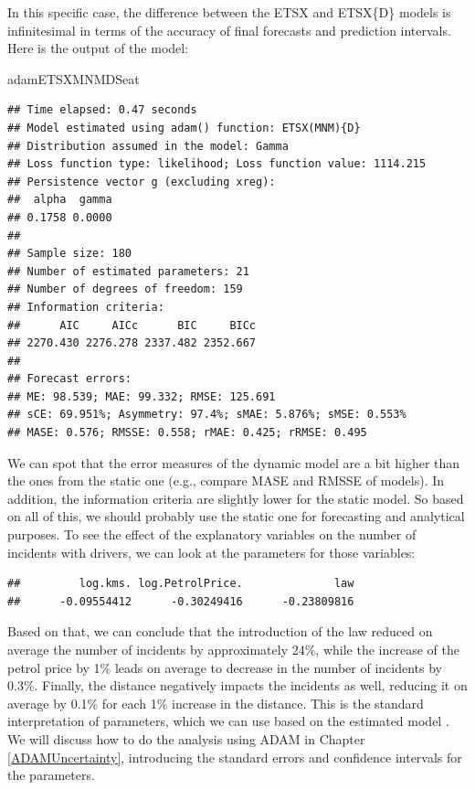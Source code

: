 \documentclass[
]{book}
\newenvironment{Shaded}{\begin{snugshade}}{\end{snugshade}}
\newcommand{\NormalTok}[1]{#1}
\newcommand{\SpecialCharTok}[1]{\textcolor[rgb]{0.00,0.00,0.00}{#1}}
\theoremstyle{definition}
\theoremstyle{definition}
\theoremstyle{definition}
\theoremstyle{definition}
\theoremstyle{remark}
\begin{document}
In this specific case, the difference between the ETSX and ETSX\{D\} models is infinitesimal in terms of the accuracy of final forecasts and prediction intervals. Here is the output of the model:

\begin{Shaded}
\begin{Highlighting}[]
\NormalTok{adamETSXMNMDSeat}
\end{Highlighting}
\end{Shaded}

\begin{verbatim}
## Time elapsed: 0.47 seconds
## Model estimated using adam() function: ETSX(MNM){D}
## Distribution assumed in the model: Gamma
## Loss function type: likelihood; Loss function value: 1114.215
## Persistence vector g (excluding xreg):
##  alpha  gamma 
## 0.1758 0.0000 
## 
## Sample size: 180
## Number of estimated parameters: 21
## Number of degrees of freedom: 159
## Information criteria:
##      AIC     AICc      BIC     BICc 
## 2270.430 2276.278 2337.482 2352.667 
## 
## Forecast errors:
## ME: 98.539; MAE: 99.332; RMSE: 125.691
## sCE: 69.951%; Asymmetry: 97.4%; sMAE: 5.876%; sMSE: 0.553%
## MASE: 0.576; RMSSE: 0.558; rMAE: 0.425; rRMSE: 0.495
\end{verbatim}

We can spot that the error measures of the dynamic model are a bit higher than the ones from the static one (e.g., compare MASE and RMSSE of models). In addition, the information criteria are slightly lower for the static model. So based on all of this, we should probably use the static one for forecasting and analytical purposes. To see the effect of the explanatory variables on the number of incidents with drivers, we can look at the parameters for those variables:

\begin{Shaded}
\end{Shaded}

\begin{verbatim}
##         log.kms. log.PetrolPrice.              law 
##      -0.09554412      -0.30249416      -0.23809816
\end{verbatim}

Based on that, we can conclude that the introduction of the law reduced on average the number of incidents by approximately 24\%, while the increase of the petrol price by 1\% leads on average to decrease in the number of incidents by 0.3\%. Finally, the distance negatively impacts the incidents as well, reducing it on average by 0.1\% for each 1\% increase in the distance. This is the standard interpretation of parameters, which we can use based on the estimated model \citep[see, for example, discussion in Section 8.3 of][]{SvetunkovSBA}. We will discuss how to do the analysis using ADAM in Chapter \ref{ADAMUncertainty}, introducing the standard errors and confidence intervals for the parameters.
\end{document}
